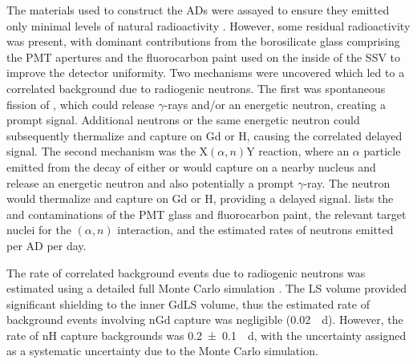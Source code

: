 The materials used to construct the ADs were
assayed to ensure they emitted only minimal levels of natural radioactivity
\cite{sidebyside}.
However, some residual radioactivity was present,
with dominant contributions from the borosilicate glass comprising the PMT apertures
and the fluorocarbon paint \cite{fluorocarbon_paint} used on the inside of the SSV
to improve the detector uniformity.
Two mechanisms were uncovered which led to a correlated background
due to radiogenic neutrons\cite{rad_n_intro}.
The first was spontaneous fission of ,
which could release $\gamma$-rays and/or an energetic neutron,
creating a prompt signal.
Additional neutrons or the same energetic neutron
could subsequently thermalize and capture on Gd or H,
causing the correlated delayed signal.
The second mechanism was the $\text{X}(\alpha, n)\text{Y}$ reaction,
where an $\alpha$ particle emitted from the decay of
either  or 
would capture on a nearby nucleus
and release an energetic neutron and also potentially a prompt $\gamma$-ray.
The neutron would thermalize and capture on Gd or H, providing a delayed signal.
 lists the  and 
contaminations of the PMT glass and fluorocarbon paint,
the relevant target nuclei for the $(\alpha,n)$ interaction,
and the estimated rates of neutrons emitted per AD per day.



The rate of correlated background events due to radiogenic neutrons
was estimated using a detailed full Monte Carlo simulation \cite{rad_n}.
The LS volume provided significant shielding to the inner GdLS volume,
thus the estimated rate of background events involving nGd capture
was negligible (\SI{0.02}{\per\day}).
However, the rate of nH capture backgrounds was \SI{0.2\pm0.1}{\per\day},
with the uncertainty assigned as a systematic uncertainty
due to the Monte Carlo simulation.


